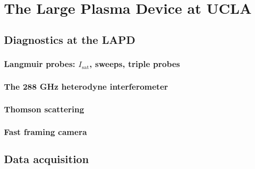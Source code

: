 %
%
%



\section{The Large Plasma Device at UCLA}

\subsection{Diagnostics at the LAPD}

\subsubsection{Langmuir probes: $I_\text{sat}$, sweeps, triple probes}

\subsubsection{The 288 GHz heterodyne interferometer}

\subsubsection{Thomson scattering}

\subsubsection{Fast framing camera}

\subsection{Data acquisition}


